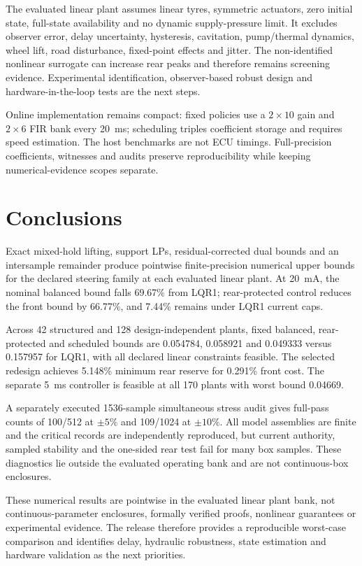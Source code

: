 \documentclass[fleqn,final,5p,times]{elsarticle}
\begin{document}
The evaluated linear plant assumes linear tyres, symmetric actuators, zero initial state, full-state availability and no dynamic supply-pressure limit. It excludes observer error, delay uncertainty, hysteresis, cavitation, pump/thermal dynamics, wheel lift, road disturbance, fixed-point effects and jitter. The non-identified nonlinear surrogate can increase rear peaks and therefore remains screening evidence. Experimental identification, observer-based robust design and hardware-in-the-loop tests are the next steps.

Online implementation remains compact: fixed policies use a $2\times10$ gain and $2\times6$ FIR bank every \SI{20}{ms}; scheduling triples coefficient storage and requires speed estimation. The host benchmarks are not ECU timings. Full-precision coefficients, witnesses and audits preserve reproducibility while keeping numerical-evidence scopes separate.

\section{Conclusions}
\label{sec:conclusions}

Exact mixed-hold lifting, support LPs, residual-corrected dual bounds and an intersample remainder produce pointwise finite-precision numerical upper bounds for the declared steering family at each evaluated linear plant. At \SI{20}{mA}, the nominal balanced bound falls 69.67\% from LQR1; rear-protected control reduces the front bound by 66.77\%, and 7.44\% remains under LQR1 current caps.

Across 42 structured and 128 design-independent plants, fixed balanced, rear-protected and scheduled bounds are 0.054784, 0.058921 and 0.049333 versus 0.157957 for LQR1, with all declared linear constraints feasible. The selected redesign achieves 5.148\% minimum rear reserve for 0.291\% front cost. The separate \SI{5}{ms} controller is feasible at all 170 plants with worst bound 0.04669.

A separately executed 1536-sample simultaneous stress audit gives full-pass counts of 100/512 at $\pm5\%$ and 109/1024 at $\pm10\%$. All model assemblies are finite and the critical records are independently reproduced, but current authority, sampled stability and the one-sided rear test fail for many box samples. These diagnostics lie outside the evaluated operating bank and are not continuous-box enclosures.

These numerical results are pointwise in the evaluated linear plant bank, not continuous-parameter enclosures, formally verified proofs, nonlinear guarantees or experimental evidence. The release therefore provides a reproducible worst-case comparison and identifies delay, hydraulic robustness, state estimation and hardware validation as the next priorities.
\end{document}
